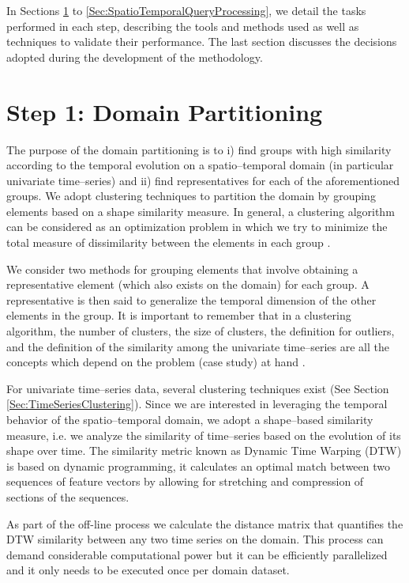 In Sections \ref{Sec:DomainPartitioning} to \ref{Sec:SpatioTemporalQueryProcessing}, we detail the tasks performed in each step, describing the tools and methods used as well as techniques to validate their performance. The last section discusses the decisions adopted during the development of the methodology.

\section{Step 1: Domain Partitioning}
\label{Sec:DomainPartitioning}

The purpose of the domain partitioning is to i) find groups with high similarity according to the temporal evolution on a spatio--temporal domain (in particular univariate time--series) and ii) find representatives for each of the aforementioned groups. We adopt clustering techniques to partition the domain by grouping elements based on a shape similarity measure. In general, a clustering algorithm can be considered as an optimization problem in which we try to minimize the total measure of dissimilarity between the elements in each group \cite{Liao2005}.

We consider two methods for grouping elements that involve obtaining a representative element (which also exists on the domain) for each group. A representative is then said to generalize the temporal dimension of the other elements in the group. It is important to remember that in a clustering algorithm, the number of clusters, the size of clusters, the definition for outliers, and the definition of the similarity among the univariate time--series are all the concepts which depend on the problem (case study) at hand \cite{Aghabozorgi2015}.

For univariate time--series data, several clustering techniques exist (See Section \ref{Sec:TimeSeriesClustering}). Since we are interested in leveraging the temporal behavior of the spatio--temporal domain, we adopt a shape--based similarity measure, i.e. we analyze the similarity of time--series based on the evolution of its shape over time. The similarity metric known as Dynamic Time Warping (DTW) \cite{Sakoe1978} is based on dynamic programming, it calculates an optimal match between two sequences of feature vectors by allowing for stretching and compression of sections of the sequences. 

As part of the off-line process we calculate the distance matrix that quantifies the DTW similarity between any two time series on the domain. This process can demand considerable computational power but it can be efficiently parallelized and it only needs to be executed once per domain dataset. 

